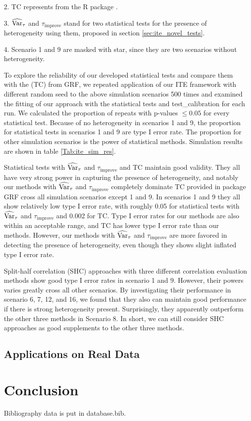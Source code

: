 \begin{table}[htbp]
\begin{threeparttable}
\begin{tablenotes}
            \item 2. TC represents  from the R package .
            \item 3. $\operatorname{\widehat{Var}}_{\tau}$ and $\tau_{\mathrm{improve}}$ stand for two statistical tests for the presence of heterogeneity using them, proposed in section \ref{sec:ite_novel_tests}.
            \item 4. Scenario 1 and 9 are masked with star, since they are two scenarios without heterogeneity.
          \end{tablenotes}
      \end{threeparttable}
    \label{Tab:ite_sim_res}%
    \end{table}%

    To explore the reliability of our developed statistical tests and compare them with the  (TC) from GRF, we repeated application of our ITE framework with different random seed to the above simulation scenarios 500 times and examined the fitting of our approach with the statistical tests and test\_calibration for each run. We calculated the proportion of repeats with p-values $\leq 0.05$ for every statistical test. Because of no heterogeneity in scenarios 1 and 9, the proportion for statistical tests in scenarios 1 and 9 are type I error rate. The proportion for other simulation scenarios is the power of statistical methods. Simulation results are shown in table \ref{Tab:ite_sim_res}.

    Statistical tests with $\operatorname{\widehat{Var}}_{\tau}$ and $\tau_{\mathrm{improve}}$ and TC maintain good validity. They all have very strong power in capturing the presence of heterogeneity, and notably our methods with $\operatorname{\widehat{Var}}_{\tau}$ and $\tau_{\mathrm{improve}}$ completely dominate TC provided in package GRF cross all simulation scenarios except 1 and 9. In scenarios 1 and 9 they all show relatively low type I error rate, with roughly 0.05 for statistical tests with $\operatorname{\widehat{Var}}_{\tau}$ and $\tau_{\mathrm{improve}}$ and 0.002 for TC. Type I error rates for our methods are also within an acceptable range, and TC has lower type I error rate than our methods. However, our methods with $\operatorname{\widehat{Var}}_{\tau}$ and $\tau_{\mathrm{improve}}$ are more favored in detecting the presence of heterogeneity, even though they shows slight inflated type I error rate.

    Split-half correlation (SHC) approaches with three different correlation evaluation methods show good type I error rates in scenario 1 and 9. However,  their powers varies greatly cross all other scenarios. By investigating their performance in scenario 6, 7, 12, and 16, we found that they also can maintain good performance if there is strong heterogeneity present. Surprisingly, they apparently outperform the other three methods in Scenario 8. In short, we can still consider SHC approaches as good supplements to the other three methods.

  \subsection{Applications on Real Data}
\section{Conclusion}
\label{sec:ite_conclusion}

Bibliography data is put in database.bib.
\chapterend